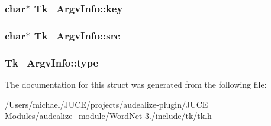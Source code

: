 \subsubsection[{\texorpdfstring{key}{key}}]{\setlength{\rightskip}{0pt plus 5cm}char$\ast$ Tk\+\_\+\+Argv\+Info\+::key}\hypertarget{struct_tk___argv_info_a22bb0557bd6b65aca1eb686371c38561}{}\label{struct_tk___argv_info_a22bb0557bd6b65aca1eb686371c38561}
\subsubsection[{\texorpdfstring{src}{src}}]{\setlength{\rightskip}{0pt plus 5cm}char$\ast$ Tk\+\_\+\+Argv\+Info\+::src}\hypertarget{struct_tk___argv_info_af76b30767502e5e5009c4f9e813df831}{}\label{struct_tk___argv_info_af76b30767502e5e5009c4f9e813df831}
\subsubsection[{\texorpdfstring{type}{type}}]{ Tk\+\_\+\+Argv\+Info\+::type}\hypertarget{struct_tk___argv_info_a24a7807435bbaa0e4a92c9508b7626e8}{}\label{struct_tk___argv_info_a24a7807435bbaa0e4a92c9508b7626e8}


The documentation for this struct was generated from the following file\+:\begin{DoxyCompactItemize}
\item 
/\+Users/michael/\+J\+U\+C\+E/projects/audealize-\/plugin/\+J\+U\+C\+E Modules/audealize\+\_\+module/\+Word\+Net-\/3./include/tk/\hyperlink{tk_8h}{tk.\+h}\end{DoxyCompactItemize}
